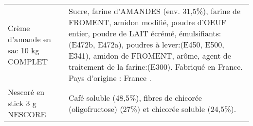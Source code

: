 \begin{longtable}{p{5cm}p{10cm}}
                                                                      Crème d'amande en sac 10 kg COMPLET &                                                                                                                                                                                                                                                                                                                                                                                                                                                                                                                                                                                                                                                                                                                              Sucre, farine d'AMANDES (env. 31,5\%), farine de FROMENT, amidon modifié, poudre d'OEUF entier,  poudre de LAIT écrémé, émulsifiants:(E472b, E472a), poudres à lever:(E450, E500, E341), amidon de  FROMENT, arôme, agent de traitement de la farine:(E300).  Fabriqué en France.  Pays d'origine : France . \\
                                                                             Nescoré en stick 3 g NESCORE &                                                                                                                                                                                                                                                                                                                                                                                                                                                                                                                                                                                                                                                                                                                                                                                                                                                                                                                                              Café soluble (48,5\%), fibres de chicorée (oligofructose) (27\%) et chicorée soluble (24,5\%). \\

\end{longtable}
